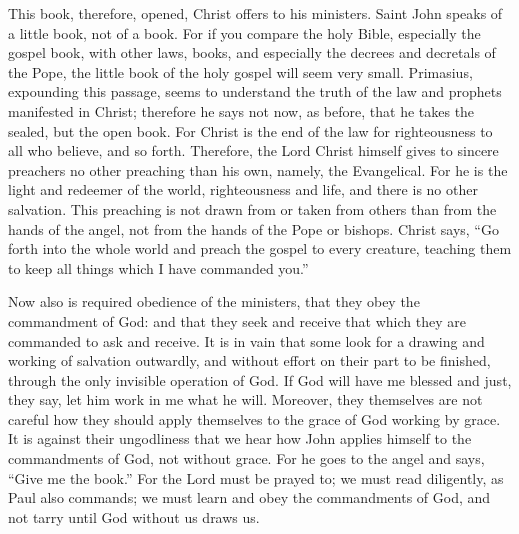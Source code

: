 This book, therefore, opened, Christ offers to his ministers. Saint John speaks of a little book, not of a book. For if you compare the holy Bible, especially the gospel book, with other laws, books, and especially the decrees and decretals of the Pope, the little book of the holy gospel will seem very small. Primasius, expounding this passage, seems to understand the truth of the law and prophets manifested in Christ; therefore he says not now, as before, that he takes the sealed, but the open book. For Christ is the end of the law for righteousness to all who believe, and so forth. Therefore, the Lord Christ himself gives to sincere preachers no other preaching than his own, namely, the Evangelical. For he is the light and redeemer of the world, righteousness and life, and there is no other salvation. This preaching is not drawn from or taken from others than from the hands of the angel, not from the hands of the Pope or bishops. Christ says, “Go forth into the whole world and preach the gospel to every creature, teaching them to keep all things which I have commanded you.”

Now also is required obedience of the ministers, that they obey the commandment of God: and that they seek and receive that which they are commanded to ask and receive. It is in vain that some look for a drawing and working of salvation outwardly, and without effort on their part to be finished, through the only invisible operation of God. If God will have me blessed and just, they say, let him work in me what he will. Moreover, they themselves are not careful how they should apply themselves to the grace of God working by grace. It is against their ungodliness that we hear how John applies himself to the commandments of God, not without grace. For he goes to the angel and says, “Give me the book.” For the Lord must be prayed to; we must read diligently, as Paul also commands; we must learn and obey the commandments of God, and not tarry until God without us draws us.

